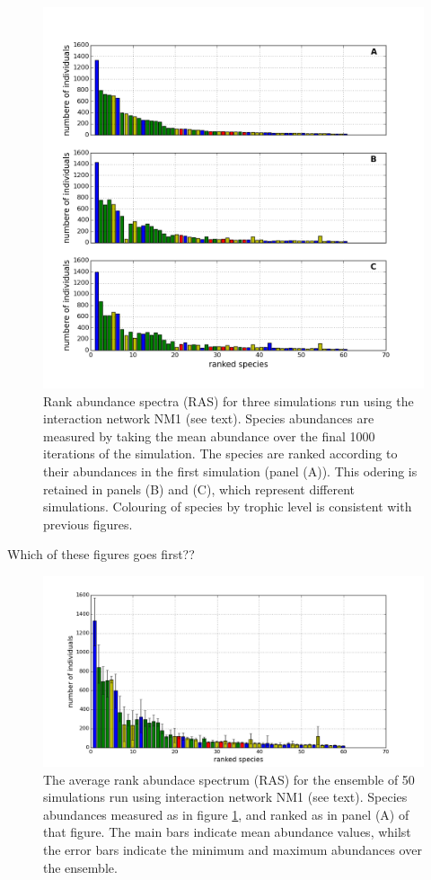 \begin{figure}[hp]
	\centering
	\includegraphics[width=1.0\linewidth]{"./chapters/chapter04b/figures/ras_3examples"}
    \caption{Rank abundance spectra (RAS) for three simulations run using the interaction network NM1 (see text). Species abundances are measured by taking the mean abundance over the final 1000 iterations of the simulation. The species are ranked according to their abundances in the first simulation (panel (A)). This odering is retained in panels (B) and (C), which represent different simulations. Colouring of species by trophic level is consistent with previous figures.}    
    \label{fig:ras_3examples}
\end{figure}

Which of these figures goes first??

\begin{figure}[h!]
	\centering
	\includegraphics[width=1.0\linewidth]{"./chapters/chapter04b/figures/ras_dist"}
    \caption{The average rank abundace spectrum (RAS) for the ensemble of 50 simulations run using interaction network NM1 (see text). Species abundances measured as in figure \ref{fig:ras_3examples}, and ranked as in panel (A) of that figure. The main bars indicate mean abundance values, whilst the error bars indicate the minimum and maximum abundances over the ensemble.}    
    \label{fig:ras_dist}
\end{figure}


